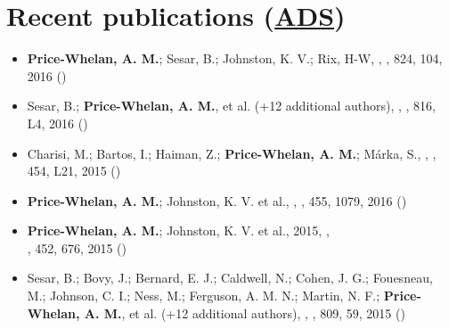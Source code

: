 \documentclass[12pt,letterpaper]{article}
\begin{document}
\section*{Recent publications (\href{\adsurl}{ADS})}

	\begin{itemize}


\item {\bf Price-Whelan, A. M.}; Sesar, B.; Johnston, K. V.; Rix, H-W, 
    ,
    \apj, 824, 104, 2016 ()

\item Sesar, B.; {\bf Price-Whelan, A. M.}, et al. (+12 additional authors), 
    ,
    \apjl, 816, L4, 2016 ()

\item Charisi, M.; Bartos, I.; Haiman, Z.; {\bf Price-Whelan, A. M.}; M\'arka, S., 
    ,
    \mnrasl, 454, L21, 2015 ()

\item {\bf Price-Whelan, A. M.}; Johnston, K. V. et al., 
    ,
    \mnras, 455, 1079, 2016 ()
    
\item {\bf Price-Whelan, A. M.}; Johnston, K. V. et al., 2015,
    ,\\
    \mnras, 452, 676, 2015 ()
    
\item Sesar, B.; Bovy, J.; Bernard, E. J.; Caldwell, N.; Cohen, J. G.; Fouesneau, M.; Johnson, C. I.; Ness, M.; Ferguson, A. M. N.; Martin, N. F.; {\bf Price-Whelan, A. M.}, et al. (+12 additional authors),
    ,
    \apj, 809, 59, 2015 ()


\end{itemize}
\end{document}
